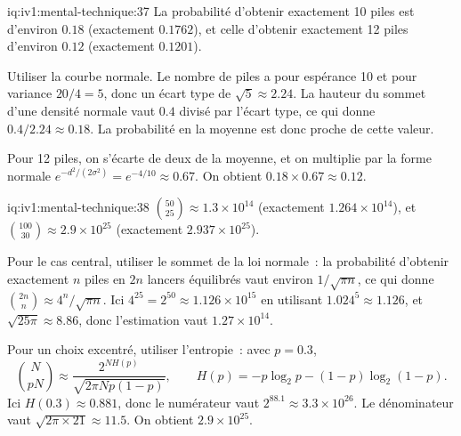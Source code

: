 \begin{solution}{iq:iv1:mental-technique:37}
La probabilité d'obtenir exactement 10 piles est d'environ $0.18$ (exactement $0.1762$), et celle d'obtenir exactement 12 piles d'environ $0.12$ (exactement $0.1201$).

Utiliser la courbe normale. Le nombre de piles a pour espérance 10 et pour variance $20/4 = 5$, donc un écart type de $\sqrt 5 \approx 2.24$. La hauteur du sommet d'une densité normale vaut $0.4$ divisé par l'écart type, ce qui donne $0.4/2.24 \approx 0.18$. La probabilité en la moyenne est donc proche de cette valeur.

Pour 12 piles, on s'écarte de deux de la moyenne, et on multiplie par la forme normale $e^{-d^2/(2\sigma^2)} = e^{-4/10} \approx 0.67$. On obtient $0.18 \times 0.67 \approx 0.12$.

\end{solution}

\begin{solution}{iq:iv1:mental-technique:38}
$\binom{50}{25} \approx 1.3 \times 10^{14}$ (exactement $1.264 \times 10^{14}$), et $\binom{100}{30} \approx 2.9 \times 10^{25}$ (exactement $2.937 \times 10^{25}$).

Pour le cas central, utiliser le sommet de la loi normale~: la probabilité d'obtenir exactement $n$ piles en $2n$ lancers équilibrés vaut environ $1/\sqrt{\pi n}$, ce qui donne $\binom{2n}{n} \approx 4^n / \sqrt{\pi n}$. Ici $4^{25} = 2^{50} \approx 1.126 \times 10^{15}$ en utilisant $1.024^5 \approx 1.126$, et $\sqrt{25\pi} \approx 8.86$, donc l'estimation vaut $1.27 \times 10^{14}$.

Pour un choix excentré, utiliser l'entropie~: avec $p = 0.3$,
\[
\binom{N}{pN} \approx \frac{2^{N H(p)}}{\sqrt{2\pi N p (1 - p)}}, \qquad H(p) = -p \log_2 p - (1 - p) \log_2 (1 - p).
\]
Ici $H(0.3) \approx 0.881$, donc le numérateur vaut $2^{88.1} \approx 3.3 \times 10^{26}$. Le dénominateur vaut $\sqrt{2\pi \times 21} \approx 11.5$. On obtient $2.9 \times 10^{25}$.

\end{solution}

